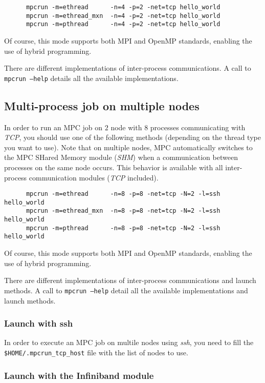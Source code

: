 \documentclass[a4paper,11pt]{article}
\begin{document}
\begin{verbatim}
      mpcrun -m=ethread      -n=4 -p=2 -net=tcp hello_world
      mpcrun -m=ethread_mxn  -n=4 -p=2 -net=tcp hello_world
      mpcrun -m=pthread      -n=4 -p=2 -net=tcp hello_world
\end{verbatim}

Of course, this mode supports both MPI and OpenMP standards, enabling the use of hybrid programming.

There are different implementations of inter-process communications.
A call to {\tt mpcrun --help} details all the available implementations.

\subsection{Multi-process job on multiple nodes}
In order to run an MPC job on $2$ node with $8$ processes communicating with \emph{TCP}, you should use one of the following methods (depending on the thread type you want to use). Note that on multiple nodes, MPC automatically switches to the MPC SHared Memory module (\emph{SHM}) when a communication between processes on the same node occurs. This behavior is available with all inter-process communication modules (\emph{TCP} included).

\begin{verbatim}
      mpcrun -m=ethread      -n=8 -p=8 -net=tcp -N=2 -l=ssh hello_world
      mpcrun -m=ethread_mxn  -n=8 -p=8 -net=tcp -N=2 -l=ssh hello_world
      mpcrun -m=pthread      -n=8 -p=8 -net=tcp -N=2 -l=ssh hello_world
\end{verbatim}

Of course, this mode supports both MPI and OpenMP standards, enabling the use of hybrid programming.

There are different implementations of inter-process communications and launch methods.
A call to {\tt mpcrun --help} detail all the available implementations and launch methods.

\subsubsection{Launch with ssh}
In order to execute an MPC job on multile nodes using \emph{ssh}, you need to fill the {\tt \${HOME}/.mpcrun\_tcp\_host} file with the list of nodes to use.

\subsubsection{Launch with the Infiniband module}
\end{document}
